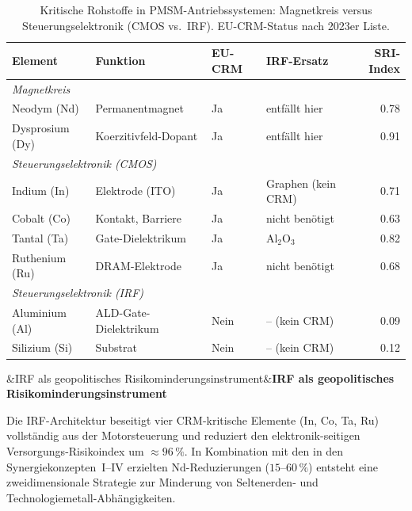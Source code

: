 ﻿\documentclass[12pt, a4paper]{report}
\newenvironment{ergebnis}[1][]{%
  \begin{ergebnisframe}\sloppy%
  \ifx&#1&\else\textbf{#1}\par\smallskip\fi}{\end{ergebnisframe}}
\theoremstyle{definition}
\theoremstyle{remark}
\begin{document}
\begin{table}[H]
  \centering
  \caption{Kritische Rohstoffe in PMSM-Antriebssystemen:
           Magnetkreis versus Steuerungselektronik
           (CMOS vs.\ IRF). EU-CRM-Status nach 2023er Liste.}
  \label{tab:crm_vergleich}
  \small
  \begin{tabular}{llllr}
    \toprule
    \textbf{Element} & \textbf{Funktion} & \textbf{EU-CRM} &
    \textbf{IRF-Ersatz} & \textbf{SRI-Index} \\
    \midrule
    \multicolumn{5}{l}{\textit{Magnetkreis}} \\
    Neodym (Nd)    & Permanentmagnet        & Ja  & entfällt hier & 0.78 \\
    Dysprosium (Dy) & Koerzitivfeld-Dopant  & Ja  & entfällt hier & 0.91 \\
    \midrule
    \multicolumn{5}{l}{\textit{Steuerungselektronik (CMOS)}} \\
    Indium (In)    & Elektrode (ITO)        & Ja  & Graphen (kein CRM) & 0.71 \\
    Cobalt (Co)    & Kontakt, Barriere      & Ja  & nicht benötigt    & 0.63 \\
    Tantal (Ta)    & Gate-Dielektrikum      & Ja  & Al$_2$O$_3$       & 0.82 \\
    Ruthenium (Ru) & DRAM-Elektrode         & Ja  & nicht benötigt    & 0.68 \\
    \midrule
    \multicolumn{5}{l}{\textit{Steuerungselektronik (IRF)}} \\
    Aluminium (Al) & ALD-Gate-Dielektrikum  & Nein  & -- (kein CRM) & 0.09 \\
    Silizium (Si)  & Substrat               & Nein  & -- (kein CRM) & 0.12 \\
    \bottomrule
  \end{tabular}
\end{table}

\begin{ergebnis}[IRF als geopolitisches Risikominderungsinstrument]
  Die IRF-Architektur beseitigt vier CRM-kritische Elemente
  (In, Co, Ta, Ru) vollständig aus der Motorsteuerung und reduziert
  den elektronik-seitigen Versorgungs-Risikoindex um $\approx 96\,\%$.
  In Kombination mit den in den Synergiekonzepten~I--IV erzielten
  Nd-Reduzierungen ($15$--$60\,\%$) entsteht eine zweidimensionale
  Strategie zur Minderung von Seltenerden- und Technologiemetall-Abhängigkeiten.
\end{ergebnis}
\end{document}
